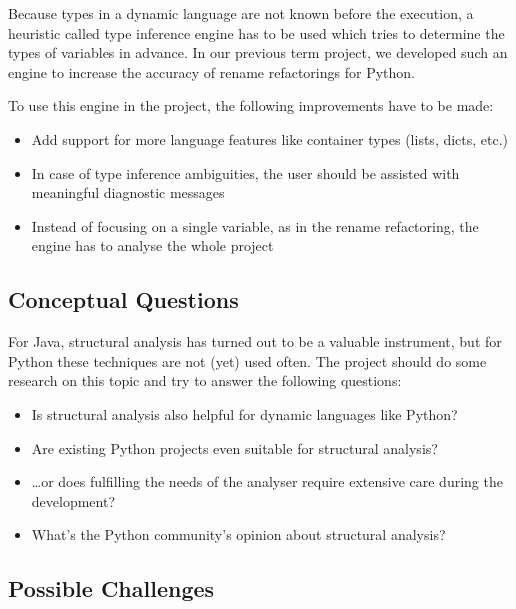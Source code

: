 \documentclass[12pt,halfparskip]{scrartcl}
\begin{document}
Because types in a dynamic language are not known before the execution, a heuristic called type inference engine has to be used which tries to determine the types of variables in advance. In our previous term project, we developed such an engine to increase the accuracy of rename refactorings for Python. 

To use this engine in the project, the following improvements have to be made:

\begin{itemize}
	\item Add support for more language features like container types (lists, dicts, etc.)
	\item In case of type inference ambiguities, the user should be assisted with meaningful diagnostic messages
	\item Instead of focusing on a single variable, as in the rename refactoring, the engine has to analyse the whole project
\end{itemize}

\subsection*{Conceptual Questions}

For Java, structural analysis has turned out to be a valuable instrument, but for Python these techniques are not (yet) used often. The project should do some research on this topic and try to answer the following questions:

\begin{itemize}
	\item Is structural analysis also helpful for dynamic languages like Python?
	\item Are existing Python projects even suitable for structural analysis?
	\item \ldots or does fulfilling the needs of the analyser require extensive care during the development?
	\item What's the Python community's opinion about structural analysis?
\end{itemize}

\subsection*{Possible Challenges}
\end{document}
